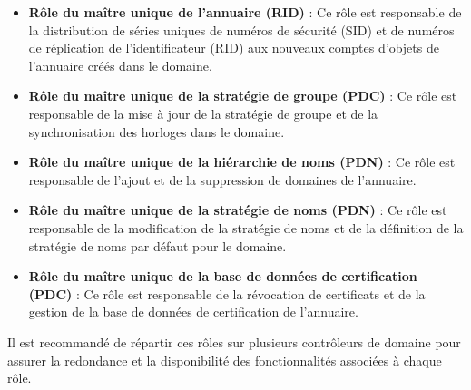 \documentclass[12pt, a4paper]{article}
\begin{document}
\begin{itemize}
    \item \textbf{Rôle du maître unique de l'annuaire (RID)} : Ce rôle est responsable de la distribution de séries uniques de numéros de sécurité (SID) et de numéros de réplication de l'identificateur (RID) aux nouveaux comptes d'objets de l'annuaire créés dans le domaine.
    \item \textbf{Rôle du maître unique de la stratégie de groupe (PDC)} : Ce rôle est responsable de la mise à jour de la stratégie de groupe et de la synchronisation des horloges dans le domaine.
    \item \textbf{Rôle du maître unique de la hiérarchie de noms (PDN)} : Ce rôle est responsable de l'ajout et de la suppression de domaines de l'annuaire.
    \item \textbf{Rôle du maître unique de la stratégie de noms (PDN)} : Ce rôle est responsable de la modification de la stratégie de noms et de la définition de la stratégie de noms par défaut pour le domaine.
    \item \textbf{Rôle du maître unique de la base de données de certification (PDC)} : Ce rôle est responsable de la révocation de certificats et de la gestion de la base de données de certification de l'annuaire.\\
    
\end{itemize}

Il est recommandé de répartir ces rôles sur plusieurs contrôleurs 
de domaine pour assurer la redondance et la disponibilité des fonctionnalités 
associées à chaque rôle.
\end{document}
